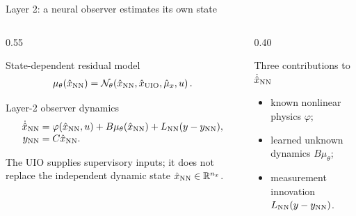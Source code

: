 \documentclass[aspectratio=169,10pt]{beamer}
\newcommand{\R}{\mathbb{R}}
\begin{document}
\begin{frame}{Layer 2: a neural observer estimates its own state}
\begin{columns}[T,onlytextwidth]
  \begin{column}{0.55\textwidth}
    \vspace{0.05cm}
    \small
    \begin{block}{State-dependent residual model}
      \vspace{-0.20cm}
      \begin{align*}
        \mu_\theta(\hat x_{\rm NN})
        =\mathcal N_\theta\!\left(
        \hat x_{\rm NN},\hat x_{\rm UIO},\hat\mu_x,u\right).
      \end{align*}
      \vspace{-0.32cm}
    \end{block}
    \vspace{0.16cm}
    \begin{block}{Layer-2 observer dynamics}
      \vspace{-0.24cm}
      \begin{align*}
        \dot{\hat x}_{\rm NN}
          &=\varphi(\hat x_{\rm NN},u)
            +B\mu_\theta(\hat x_{\rm NN})
            +L_{\rm NN}(y-y_{\rm NN}),\\[-1mm]
        y_{\rm NN}&=C\hat x_{\rm NN}.
      \end{align*}
      \vspace{-0.32cm}
    \end{block}
    \vspace{0.01cm}
    \scriptsize
    The UIO supplies supervisory inputs; it does not replace the independent
    dynamic state $\hat x_{\rm NN}\in\R^{n_x}$.
  \end{column}
  \begin{column}{0.40\textwidth}
    \vspace{0.05cm}
    \begin{block}{Three contributions to $\dot{\hat x}_{\rm NN}$}
      \small
      \begin{itemize}
        \item known nonlinear physics $\varphi$;
        \item learned unknown dynamics $B\mu_\theta$;
        \item measurement innovation $L_{\rm NN}(y-y_{\rm NN})$.
      \end{itemize}
    \end{block}
    \vspace{0.01cm}

\end{column}
\end{columns}
\end{frame}
\end{document}
